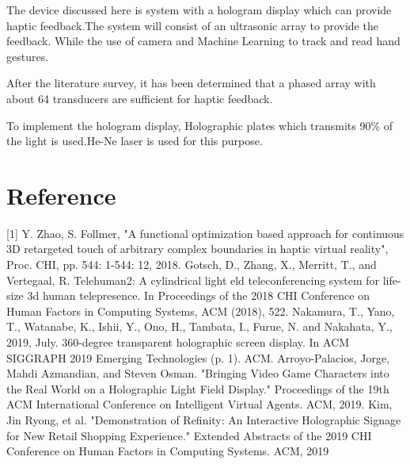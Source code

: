 \documentclass{fisatproject}
\begin{document}
\par The device discussed here is system with a hologram display which can provide haptic feedback.The system will consist of an ultrasonic array to provide the feedback. While the use of camera and Machine Learning to track and read hand gestures.
\par After the literature survey, it has been determined that a phased array with about 64 transducers are sufficient for haptic feedback.
\par To implement the hologram display, Holographic plates which transmits 90\% of the light is used.He-Ne laser is used for this purpose.


\chapter{Reference}
[1]	Y. Zhao, S. Follmer, "A functional optimization based approach for continuous 3D retargeted touch of arbitrary complex boundaries in haptic virtual reality", Proc. CHI, pp. 544: 1-544: 12, 2018.
\newline
\newline
[2] Gotsch, D., Zhang, X., Merritt, T., and Vertegaal, R. Telehuman2: A cylindrical light eld teleconferencing system for life-size 3d human telepresence. In Proceedings of the 2018 CHI Conference on Human Factors in Computing Systems, ACM (2018), 522.
\newline
\newline
[3] Nakamura, T., Yano, T., Watanabe, K., Ishii, Y., Ono, H., Tambata, I., Furue, N. and Nakahata, Y., 2019, July. 360-degree transparent holographic screen display. In ACM SIGGRAPH 2019 Emerging Technologies (p. 1). ACM.
\newline
\newline
[4] Arroyo-Palacios, Jorge, Mahdi Azmandian, and Steven Osman. "Bringing Video Game Characters into the Real World on a Holographic Light Field Display." Proceedings of the 19th ACM International Conference on Intelligent Virtual Agents. ACM, 2019.
\newline
\newline
[5] Kim, Jin Ryong, et al. "Demonstration of Refinity: An Interactive Holographic Signage for New Retail Shopping Experience." Extended Abstracts of the 2019 CHI Conference on Human Factors in Computing Systems. ACM, 2019
\end{document}

